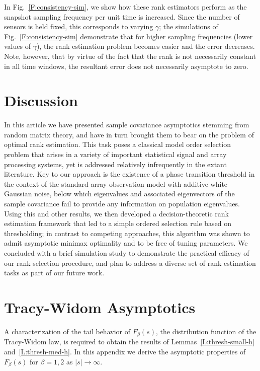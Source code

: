 \documentclass[final]{IEEEtran}
\begin{document}
In Fig.~\ref{F:consistency-sim}, we show how these rank estimators perform as the snapshot sampling frequency per unit time is increased.  Since the number of sensors is held fixed, this corresponds to varying $\gamma$; the simulations of Fig.~\ref{F:consistency-sim} demonstrate that for higher sampling frequencies (lower values of $\gamma$), the rank estimation problem becomes easier and the error decreases.  Note, however, that by virtue of the fact that the rank is not necessarily constant in all time windows, the resultant error does not necessarily asymptote to zero.

\section{Discussion}
\label{s:summ}

In this article we have presented sample covariance asymptotics stemming from random matrix theory, and have in turn brought them to bear on the problem of optimal rank estimation.  This task poses a classical model order selection problem that arises in a variety of important statistical signal and array processing systems, yet is addressed relatively infrequently in the extant literature.  Key to our approach is the existence of a phase transition threshold in the context of the standard array observation model with additive white Gaussian noise, below which eigenvalues and associated eigenvectors of the sample covariance fail to provide any information on population eigenvalues.  Using this and other results, we then developed a decision-theoretic rank estimation framework that led to a simple ordered selection rule based on thresholding; in contrast to competing approaches, this algorithm was shown to admit asymptotic minimax optimality and to be free of tuning parameters.  We concluded with a brief simulation study to demonstrate the practical efficacy of our rank selection procedure, and plan to address a diverse set of rank estimation tasks as part of our future work.

\appendices

\section{Tracy-Widom Asymptotics}\label{S:tw-asymp}

A characterization of the tail behavior of $F_\beta(s)$, the distribution function of the Tracy-Widom law, is required to obtain the results of Lemmas~\ref{L:thresh-small-h} and~\ref{L:thresh-med-h}.  In this appendix we derive the asymptotic properties of $F_\beta(s)$ for $\beta=1,2$ as
$|s| \to \infty$.
\end{document}

